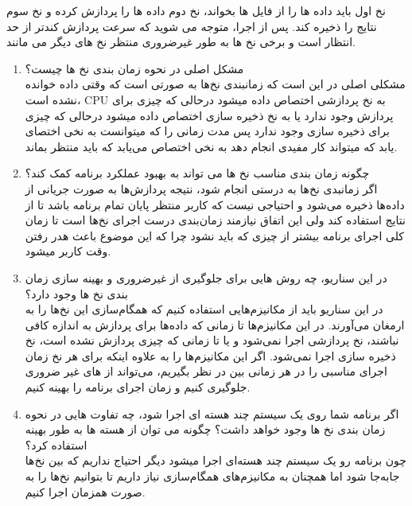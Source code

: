 \documentclass[]{article}
\begin{document}
\begin{enumerate}[(A)]
    ﻧﺦ ﺍﻭﻝ ﺑﺎﯾﺪ ﺩﺍﺩﻩ ﻫﺎ ﺭﺍ ﺍﺯ ﻓﺎﯾﻞ ﻫﺎ ﺑﺨﻮﺍﻧﺪ، ﻧﺦ ﺩﻭﻡ ﺩﺍﺩﻩ ﻫﺎ ﺭﺍ ﭘﺮﺩﺍﺯﺵ ﮐﺮﺩﻩ ﻭ ﻧﺦ ﺳﻮﻡ ﻧﺘﺎﯾﺞ ﺭﺍ ﺫﺧﯿﺮﻩ ﮐﻨﺪ. ﭘﺲ ﺍﺯ ﺍﺟﺮﺍ، ﻣﺘﻮﺟﻪ ﻣﯽ ﺷﻮﯾﺪ
    ﮐﻪ ﺳﺮﻋﺖ ﭘﺮﺩﺍﺯﺵ ﮐﻨﺪﺗﺮ ﺍﺯ ﺣﺪ ﺍﻧﺘﻈﺎﺭ ﺍﺳﺖ ﻭ ﺑﺮﺧﯽ ﻧﺦ ﻫﺎ ﺑﻪ ﻃﻮﺭ ﻏﯿﺮﺿﺮﻭﺭﯼ ﻣﻨﺘﻈﺮ ﻧﺦ ﻫﺎﯼ ﺩﯾﮕﺮ ﻣﯽ ﻣﺎﻧﻨﺪ.
        \begin{enumerate}
            \item ﻣﺸﮑﻞ ﺍﺻﻠﯽ ﺩﺭ ﻧﺤﻮﻩ ﺯﻣﺎﻥ ﺑﻨﺪﯼ ﻧﺦ ﻫﺎ ﭼﯿﺴﺖ؟
            \\
            مشکلی اصلی در این است که زمانبندی نخ‌ها به صورتی است که وقتی داده خوانده نشده است،
            CPU به نخ پردازشی اختصاص داده میشود درحالی که چیزی برای پردازش وجود ندارد
            یا به نخ ذخیره سازی اختصاص داده میشود درحالی که چیزی برای ذخیره سازی وجود ندارد
            پس مدت زمانی را که میتوانست به نخی اختصای یابد که میتواند کار مفیدی انجام دهد به نخی اختصاص می‌یابد که
            باید منتظر بماند.

            \item ﭼﮕﻮﻧﻪ ﺯﻣﺎﻥ ﺑﻨﺪﯼ ﻣﻨﺎﺳﺐ ﻧﺦ ﻫﺎ ﻣﯽ ﺗﻮﺍﻧﺪ ﺑﻪ ﺑﻬﺒﻮﺩ ﻋﻤﻠﮑﺮﺩ ﺑﺮﻧﺎﻣﻪ ﮐﻤﮏ ﮐﻨﺪ؟
            \\
            اگر زمانبدی نخ‌ها به درستی انجام شود، نتیجه پردازش‌ها به صورت جریانی از داده‌ها
            ذخیره می‌شود و احتیاجی نیست که کاربر منتظر پایان تمام برنامه باشد تا از نتایج استفاده کند
            ولی این اتفاق نیازمند زمان‌بندی درست اجرای نخ‌ها است تا زمان کلی اجرای برنامه بیشتر از چیزی که باید نشود
            چرا که این موضوع باعث هدر رفتن وقت کاربر میشود.
            \item ﺩﺭ ﺍﯾﻦ ﺳﻨﺎﺭﯾﻮ، ﭼﻪ ﺭﻭﺵ ﻫﺎﯾﯽ ﺑﺮﺍﯼ ﺟﻠﻮﮔﯿﺮﯼ ﺍﺯ
            ﻏﯿﺮﺿﺮﻭﺭﯼ ﻭ ﺑﻬﯿﻨﻪ ﺳﺎﺯﯼ ﺯﻣﺎﻥ ﺑﻨﺪﯼ ﻧﺦ ﻫﺎ ﻭﺟﻮﺩ ﺩﺍﺭﺩ؟
            \\
            در این سناریو باید از مکانیزم‌هایی استفاده کنیم که همگام‌سازی این نخ‌ها را به ارمغان می‌آورند.
            در این مکانیزم‌ها تا زمانی که داده‌ها برای پردازش به اندازه کافی نباشند، نخ پردازشی اجرا نمی‌شود
            و یا تا زمانی که چیزی پردازش نشده است، نخ ذخیره سازی اجرا نمی‌شود.
            اگر این مکانیزم‌ها را به علاوه اینکه برای هر نخ زمان اجرای مناسبی را در هر زمانی بین 
            در نظر بگیریم، می‌تواند از 
            های غیر ضروری جلوگیری کنیم و زمان اجرای برنامه را بهینه کنیم.
            \item ﺍﮔﺮ ﺑﺮﻧﺎﻣﻪ ﺷﻤﺎ ﺭﻭﯼ ﯾﮏ ﺳﯿﺴﺘﻢ ﭼﻨﺪ ﻫﺴﺘﻪ ﺍﯼ ﺍﺟﺮﺍ ﺷﻮﺩ، ﭼﻪ ﺗﻔﺎﻭﺕ ﻫﺎﯾﯽ ﺩﺭ ﻧﺤﻮﻩ ﺯﻣﺎﻥ ﺑﻨﺪﯼ ﻧﺦ ﻫﺎ ﻭﺟﻮﺩ ﺧﻮﺍﻫﺪ ﺩﺍﺷﺖ؟
            ﭼﮕﻮﻧﻪ ﻣﯽ ﺗﻮﺍﻥ ﺍﺯ ﻫﺴﺘﻪ ﻫﺎ ﺑﻪ ﻃﻮﺭ ﺑﻬﯿﻨﻪ ﺍﺳﺘﻔﺎﺩﻩ ﮐﺮﺩ؟
            \\
            چون برنامه رو یک سیستم چند هسته‌ای اجرا میشود دیگر احتیاج نداریم که بین نخ‌ها جابه‌جا شود اما همچنان
            به مکانیزم‌های همگام‌سازی نیاز داریم تا بتوانیم نخ‌ها را به صورت همزمان اجرا کنیم.


\end{enumerate}
\end{enumerate}
\end{document}
